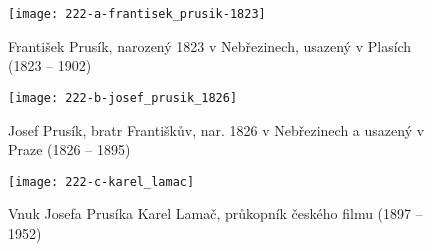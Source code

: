 \begin{figure}
\centering
\texttt{[image: 222-a-frantisek\_prusik-1823]}
\caption{František Prusík, narozený 1823 v Nebřezinech, usazený v Plasích (1823 – 1902)}
\label{fig:222-a-frantisek_prusik-1823}
\end{figure}

             \begin{figure}
\centering
\texttt{[image: 222-b-josef\_prusik\_1826]}
\caption{Josef Prusík, bratr Františkův, nar. 1826 v Nebřezinech a usazený v Praze (1826 – 1895)}
\label{fig:222-b-josef_prusik_1826}
\end{figure}

\begin{figure}
\centering
\texttt{[image: 222-c-karel\_lamac]}
\caption{Vnuk Josefa Prusíka Karel Lamač, průkopník českého filmu (1897 – 1952)}
\label{fig:222-c-karel_lamac}
\end{figure}


